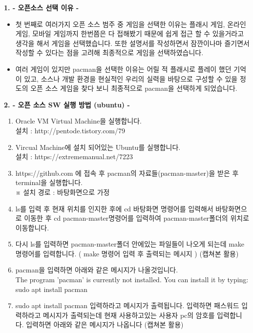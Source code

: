 \documentclass{article}
\begin{document}
\flushleft
\begin{large}\textbf{1. - 오픈소스 선택 이유 -}\end{large}
\begin{itemize}

\item 첫 번째로 여러가지 오픈 소스 범주 중 게임을 선택한 이유는 플래시 게임, 온라인 게임, 모바일 게임까지 한번쯤은 다 접해봤기 때문에 쉽게 접근 할 수 있을거라고 생각을 해서 게임을 선택했습니다. 또한 설명서를 작성하면서 잠깐이나마 즐기면서 작성할 수 있다는 점을 고려해 최종적으로 게임을 선택하였습니다.\\

\item 여러 게임이 있지만 pacman을 선택한 이유는 어릴 적 플래시로 플레이 했던 기억이 있고, 소스나 개발 환경을 현실적인 우리의 실력을 바탕으로 구성할 수 있을 정도의 오픈 소스 게임을 찾다 보니 최종적으로 pacman을 선택하게 되었습니다.

\end{itemize}

\newpage
\begin{large}\textbf{2. - 오픈 소스 SW 실행 방법 (ubuntu) -}\end{large}
\begin{enumerate}
\item Oracle VM Virtual Machine을 실행합니다. \\
설치 : http://pentode.tistory.com/79\\

\item Vircual Machine에 설치 되어있는 Ubuntu를 실행합니다. \\
설치 : https://extrememanual.net/7223\\

\item https://github.com 에 접속 후 pacman의 자료들(pacman-master)을 받은 후 terminal을 실행합니다. \\※ 설치 경로 : 바탕화면으로 가정\\
\item ls를 입력 후 현재 위치를 인지한 후에 cd 바탕화면 명령어를 입력해서 바탕화면으로 이동한 후 cd pacman-master명령어를 입력하여 pacman-master폴더의 위치로 이동합니다.\\
\item 다시 ls를 입력하면 pacman-master폴더 안에있는 파일들이 나오게 되는데 make 명령어를 입력합니다. ( make 명령어 입력 후 출력되는 메시지 ) (캡쳐본 활용)\\
\item pacman을 입력하면 아래와 같은 메시지가 나올것입니다. \\
The program 'pacman' is currently not installed. You can install it by typing: sudo apt install pacman\\
\item sudo apt install pacman 입력하라고 메시지가 출력됩니다. 입력하면 패스워드 입력하라고 메시지가 출력되는데 현재 사용하고있는 사용자 pc의 암호를 입력합니다. 입력하면 아래와 같은 메시지가 나옵니다 (캡쳐본 활용)
\end{enumerate}
\end{document}
